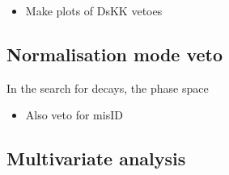 



{\color{Red}
\begin{itemize}
\item Make plots of DsKK vetoes
\end{itemize}
}

\subsection{Normalisation mode veto}
\label{sec:normvetos}

In the search for \decay{\Bp}{\Dsp\Kp\Km} decays, the phase space 


{\color{Red}
\begin{itemize}
\item Also veto for \Km\pip misID
\end{itemize}
}

\subsection{Multivariate analysis}

